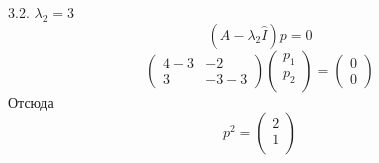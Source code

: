\documentclass[10pt]{report}
\begin{document}
3.2. $\lambda_2=3$\\
\[(A-\lambda_2 \hat{I})p=0\]
\[\left(
\begin{array}{cc}
4-3 & -2\\
3 & -3-3
\end{array}
\right)
\left(
\begin{array}{cc}
p_1\\
p_2\\
\end{array}
\right)=
\left(
\begin{array}{c}
0\\
0
\end{array}
\right)
\]
Отсюда
\[p^2=
\left(
\begin{array}{cc}
2\\
1\\
\end{array}
\right)
\]
\end{document}
